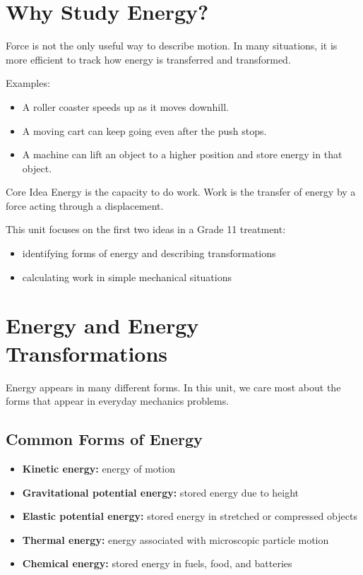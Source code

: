 



\maketitle

\section{Why Study Energy?}
Force is not the only useful way to describe motion. In many situations, it is more efficient to track how energy is transferred and transformed.

Examples:
\begin{itemize}
    \item A roller coaster speeds up as it moves downhill.
    \item A moving cart can keep going even after the push stops.
    \item A machine can lift an object to a higher position and store energy in that object.
\end{itemize}

\begin{keyidea}{Core Idea}
Energy is the capacity to do work. Work is the transfer of energy by a force acting through a displacement.
\end{keyidea}

This unit focuses on the first two ideas in a Grade 11 treatment:
\begin{itemize}
    \item identifying forms of energy and describing transformations
    \item calculating work in simple mechanical situations
\end{itemize}

\section{Energy and Energy Transformations}
Energy appears in many different forms. In this unit, we care most about the forms that appear in everyday mechanics problems.

\subsection{Common Forms of Energy}
\begin{itemize}
    \item \textbf{Kinetic energy:} energy of motion
    \item \textbf{Gravitational potential energy:} stored energy due to height
    \item \textbf{Elastic potential energy:} stored energy in stretched or compressed objects
    \item \textbf{Thermal energy:} energy associated with microscopic particle motion
    \item \textbf{Chemical energy:} stored energy in fuels, food, and batteries
\end{itemize}

